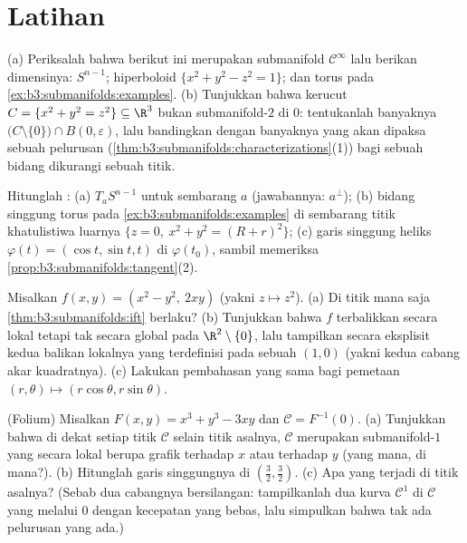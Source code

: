\section{Latihan}

\begin{exercise}[$\star$]\label{exo:b3:submanifolds:1}
(a) Periksalah bahwa berikut ini merupakan submanifold $\mathcal C^\infty$
lalu berikan dimensinya: $S^{n-1}$;
hiperboloid $\{x^2 + y^2 - z^2 = 1\}$; dan torus pada
\cref{ex:b3:submanifolds:examples}.
(b) Tunjukkan bahwa kerucut $C = \{x^2 + y^2 = z^2\} \subseteq
\R^3$ bukan submanifold-$2$ di $0$: tentukanlah banyaknya
$\bigl(C\setminus\{0\}\bigr)\cap B(0,\varepsilon)$, lalu
bandingkan dengan banyaknya yang akan dipaksa sebuah pelurusan
(\cref{thm:b3:submanifolds:characterizations}(1))
bagi sebuah bidang dikurangi sebuah titik.
\end{exercise}

\begin{exercise}[$\star$]\label{exo:b3:submanifolds:2}
Hitunglah :
(a) $T_aS^{n-1}$ untuk sembarang $a$ (jawabannya: $a^\perp$);
(b) bidang singgung torus pada
\cref{ex:b3:submanifolds:examples} di sembarang titik
khatulistiwa luarnya $\{z = 0,\ x^2 + y^2 = (R + r)^2\}$;
(c) garis singgung heliks $\varphi(t) = (\cos t,
\sin t, t)$ di $\varphi(t_0)$, sambil memeriksa
\cref{prop:b3:submanifolds:tangent}(2).
\end{exercise}

\begin{exercise}[$\star\star$]\label{exo:b3:submanifolds:3}
Misalkan $f(x, y) = (x^2 - y^2,\ 2xy)$ (yakni $z \mapsto z^2$).
(a) Di titik mana saja \cref{thm:b3:submanifolds:ift} berlaku?
(b) Tunjukkan bahwa $f$ terbalikkan secara lokal tetapi tak secara global pada
$\R^2\setminus\{0\}$, lalu tampilkan secara eksplisit kedua balikan
lokalnya yang terdefinisi pada sebuah  $(1, 0)$ (yakni kedua
cabang akar kuadratnya).
(c) Lakukan pembahasan yang sama bagi pemetaan  $(r,
\theta) \mapsto (r\cos\theta, r\sin\theta)$.
\end{exercise}

\begin{exercise}[$\star\star$]\label{exo:b3:submanifolds:4}
(Folium) Misalkan $F(x,y) = x^3 + y^3 - 3xy$ dan $\mathcal C =
F^{-1}(0)$.
(a) Tunjukkan bahwa di dekat setiap titik $\mathcal C$ selain
titik asalnya, $\mathcal C$ merupakan submanifold-$1$ yang secara lokal berupa grafik terhadap
$x$ atau terhadap $y$ (yang mana, di mana?).
(b) Hitunglah garis singgungnya di $(\frac32, \frac32)$.
(c) Apa yang terjadi di titik asalnya? (Sebab dua cabangnya bersilangan:
tampilkanlah dua kurva $\mathcal C^1$ di $\mathcal C$ yang melalui $0$
dengan kecepatan yang bebas, lalu simpulkan bahwa tak ada
pelurusan yang ada.)
\end{exercise}

